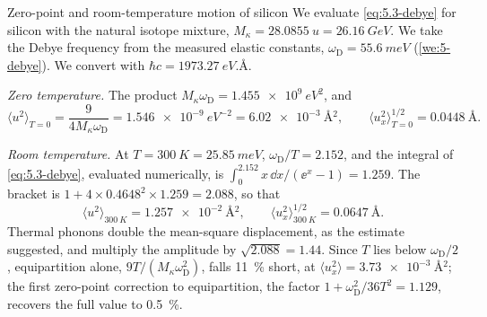 \begin{workedexample}{Zero-point and room-temperature motion of silicon}\label{we:5-u2}
We evaluate \cref{eq:5.3-debye} for silicon with the natural isotope mixture, $M_\kappa = \SI{28.0855}{u} = \SI{26.16}{GeV}$. We take the Debye frequency from the measured elastic constants, $\omega_{\mathrm{D}} = \SI{55.6}{meV}$ (\cref{we:5-debye}). We convert with $\hbar c = \SI{1973.27}{eV.\angstrom}$.

\emph{Zero temperature.} The product $M_\kappa\omega_{\mathrm{D}} = \SI{1.455e9}{eV^2}$, and
\begin{equation*}
  \langle u^2\rangle_{T=0} = \frac{9}{4M_\kappa\omega_{\mathrm{D}}} = \SI{1.546e-9}{eV^{-2}} = \SI{6.02e-3}{\angstrom^2} , \qquad
  \langle u_x^2\rangle^{1/2}_{T=0} = \SI{0.0448}{\angstrom} .
\end{equation*}

\emph{Room temperature.} At $T = \SI{300}{K} = \SI{25.85}{meV}$, $\omega_{\mathrm{D}}/T = 2.152$, and the integral of \cref{eq:5.3-debye}, evaluated numerically, is $\int_0^{2.152}x\,\dd x/(\ee^x - 1) = 1.259$. The bracket is $1 + 4\times0.4648^2\times1.259 = 2.088$, so that
\begin{equation*}
  \langle u^2\rangle_{\SI{300}{K}} = \SI{1.257e-2}{\angstrom^2} , \qquad
  \langle u_x^2\rangle^{1/2}_{\SI{300}{K}} = \SI{0.0647}{\angstrom} .
\end{equation*}
Thermal phonons double the mean-square displacement, as the estimate suggested, and multiply the amplitude by $\sqrt{2.088} = 1.44$. Since $T$ lies below $\omega_{\mathrm{D}}/2$, equipartition alone, $9T/(M_\kappa\omega^2_{\mathrm{D}})$, falls \SI{11}{\percent} short, at $\langle u_x^2\rangle = \SI{3.73e-3}{\angstrom^2}$; the first zero-point correction to equipartition, the factor $1 + \omega_{\mathrm{D}}^2/36T^2 = 1.129$, recovers the full value to \SI{0.5}{\percent}.


\end{workedexample}
